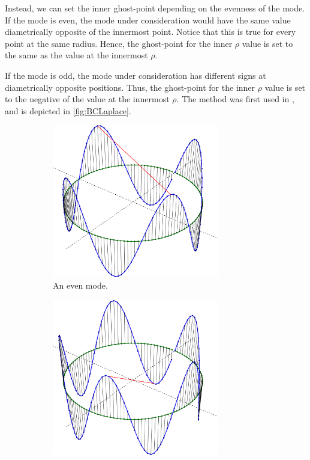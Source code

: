 Instead, we can set the inner ghost-point depending on the evenness of the mode.
If the mode is even, the mode under consideration would have the same value diametrically opposite of the innermost point.
Notice that this is true for every point at the same radius.
Hence, the ghost-point for the inner $\rho$ value is set to the same as the value at the innermost $\rho$.

If the mode is odd, the mode under consideration has different signs at diametrically opposite positions.
Thus, the ghost-point for the inner $\rho$ value is set to the negative of the value at the innermost $\rho$.
The method was first used in \cite{Naulin2008}, and is depicted in \cref{fig:BCLaplace}.
%
\begin{figure}[h!]
    \centering
    \begin{subfigure}[t]{0.5\textwidth}
        \centering
        \includegraphics[width=0.8\textwidth]{fig/mode_4}
        \caption{An even mode.}
    \end{subfigure}%
    \hfill
    \begin{subfigure}[t]{0.5\textwidth}
        \centering
        \includegraphics[width=0.8\textwidth]{fig/mode_5}

\end{subfigure}
\end{figure}
